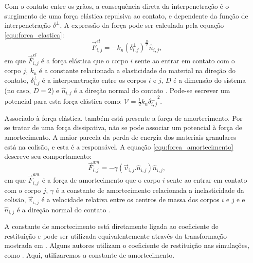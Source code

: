     Com o contato entre os grãos, a consequência direta da interpenetração é o surgimento de uma força elástica repulsiva ao contato, e dependente da função de interpenetração $\delta^{\perp}$. A expressão da força pode ser calculada pela equação \ref{equ:forca_elastica}:
\begin{equation}
    \label{equ:forca_elastica}
    \vec{F}_{i,j}^{el} = -k_{n}\left(\delta_{i,j}^{\perp}\right)^{\frac{D}{2}}\hat{n}_{i,j},
\end{equation}
em que $\vec{F}_{i,j}^{el}$ é a força elástica que o corpo $i$ sente ao entrar em contato com o corpo $j$, $k_{n}$ é a constante relacionada a elasticidade do material na direção do contato, $\delta_{i,j}^{\perp}$ é a interpenetração entre os corpos $i$ e $j$, $D$ é a dimensão do sistema (no caso, $D=2$) e $\hat{n}_{i,j}$ é a direção normal do contato \cite{Dissertacao, Caio-Tese, Landau}. Pode-se escrever um potencial para esta força elástica como: $\mathcal{V} = \frac{1}{2}k_{n}{\delta_{i,j}^{\perp}}^2$.

    Associado à força elástica, também está presente a força de amortecimento. Por se tratar de uma força dissipativa, não se pode associar um potencial à força de amortecimento. A maior parcela da perda de energia dos materiais granulares está na colisão, e esta é a responsável. A equação \ref{equ:forca_amortecimento} descreve seu comportamento:
\begin{equation}
    \label{equ:forca_amortecimento}
    \vec{F}_{i,j}^{am} = -\gamma \left(\vec{v}_{i,j}.\hat{n}_{i,j}\right)\hat{n}_{i,j},
\end{equation}
em que $\vec{F}_{i,j}^{am}$ é a força de amortecimento que o corpo $i$ sente ao entrar em contato com o corpo $j$, $\gamma$ é a constante de amortecimento relacionada a inelasticidade da colisão, $\vec{v}_{i,j}$ é a velocidade relativa entre os centros de massa dos corpos $i$ e $j$ e e $\hat{n}_{i,j}$ é a direção normal do contato \cite{Dissertacao, Caio-Tese, Computational_Granular_Dynamics}.

    A constante de amortecimento está diretamente ligada ao coeficiente de restituição e pode ser utilizada equivalentemente através da transformação mostrada em \cite{Dissertacao}. Alguns autores utilizam o coeficiente de restituição nas simulações, como \cite{Computational_Granular_Dynamics, Luding-Tese, Srdjan-Tese}. Aqui, utilizaremos a constante de amortecimento.

